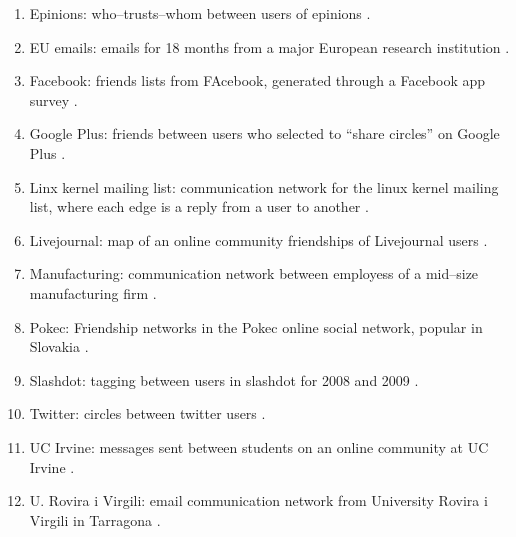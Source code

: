 \documentclass[3p,times]{elsarticle}
\begin{document}
\begin{enumerate}
    \item Epinions: who--trusts--whom between users of epinions \cite{epinions}.

    \item EU emails: emails for 18 months from a major European research institution \cite{EU}.

    \item Facebook: friends lists from FAcebook, generated through a Facebook app survey \cite{facebook}.

    \item Google Plus: friends between users who selected to ``share circles'' on Google Plus \cite{facebook}.

    \item Linx kernel mailing list: communication network for the linux kernel mailing list, where each edge is a reply from a user to another \cite{linux}.

    \item Livejournal: map of an online community friendships of Livejournal users \cite{livejournal}.

    \item Manufacturing: communication network between employess of a mid--size manufacturing firm \cite{manufacturing}.

    \item Pokec: Friendship networks in the Pokec online social network, popular in Slovakia \cite{pokec}.

    \item Slashdot: tagging between users in slashdot for 2008 and 2009 \cite{livejournal}.

    \item Twitter: circles between twitter users \cite{facebook}.

    \item UC Irvine: messages sent between students on an online community at UC Irvine \cite{irvine}.

    \item U. Rovira i Virgili: email communication network from University Rovira i Virgili in Tarragona \cite{URV}.





\end{enumerate}
\end{document}
